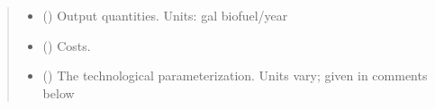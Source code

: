 \documentclass[letterpaper,10pt,english]{sphinxmanual}
\begin{document}
\begin{fulllineitems}
\begin{quote}
\begin{description}
\begin{itemize}
\item {} 
 () \textendash{} Output quantities. Units: gal biofuel/year

\item {} 
 () \textendash{} Costs.

\item {} 
 () \textendash{} The technological parameterization. Units vary; given in comments below

\end{itemize}

\end{description}\end{quote}

\end{fulllineitems}

\end{document}
